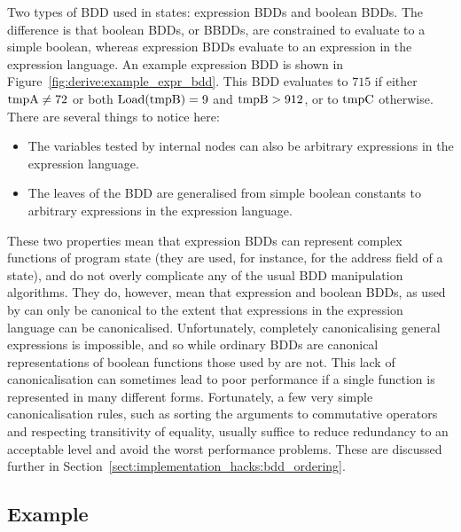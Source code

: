 Two types of BDD used in {\StateMachine} states: expression BDDs and
boolean BDDs.  The difference is that boolean BDDs, or BBDDs, are
constrained to evaluate to a simple boolean, whereas expression BDDs
evaluate to an expression in the expression language.  An example
expression BDD is shown in Figure~\ref{fig:derive:example_expr_bdd}.
This BDD evaluates to $715$ if either $\mathrm{tmpA} \not= 72$ or both
$\mathrm{Load}(\mathrm{tmpB}) = 9$ and $\mathrm{tmpB} > 912$, or to $\mathrm{tmpC}$
otherwise.  There are several things to notice here:

\begin{itemize}
\item The variables tested by internal nodes can also be arbitrary
  expressions in the expression language.
\item The leaves of the BDD are generalised from simple boolean
  constants to arbitrary expressions in the expression language.
\end{itemize}

These two properties mean that expression BDDs can represent complex
functions of program state (they are used, for instance, for the
address field of a  state), and do not overly complicate
any of the usual BDD manipulation algorithms.  They do, however, mean
that expression and boolean BDDs, as used by {\technique} can only be
canonical to the extent that expressions in the expression language
can be canonicalised.  Unfortunately, completely canonicalising
general expressions is impossible, and so while ordinary BDDs are canonical representations
of boolean functions those used by {\technique} are not.  This lack of
canonicalisation can sometimes lead to poor performance if a single
function is represented in many different forms.  Fortunately, a few
very simple canonicalisation rules, such as sorting the arguments to
commutative operators and respecting transitivity of equality, usually
suffice to reduce redundancy to an acceptable level and avoid the
worst performance problems.  These are discussed further in
Section~\ref{sect:implementation_hacks:bdd_ordering}.

\subsection{Example}

